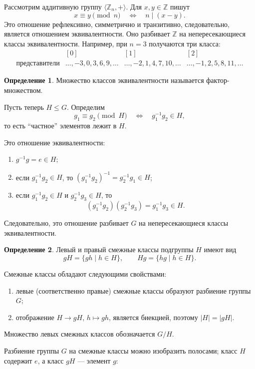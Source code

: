 \documentclass[12pt,a4paper,oneside,openany]{book}
\theoremstyle{definition}
\newtheorem{definition}{Определение}[chapter]
\theoremstyle{plain}
\theoremstyle{remark}
\newcommand{\Z}{\mathbb{Z}}
\begin{document}
Рассмотрим аддитивную группу $\langle\Z_n,+\rangle$. Для $x,y\in\Z$
пишут
\[
  x\equiv y\pmod n
  \quad\Longleftrightarrow\quad
  n\mid(x-y).
\]
Это отношение рефлексивно, симметрично и транзитивно, следовательно,
является отношением эквивалентности. Оно разбивает $\Z$ на
непересекающиеся классы эквивалентности. Например, при $n=3$ получаются
три класса:
\[
\begin{array}{c|ccc}
 & [0]&[1]&[2]\\ \hline
\text{представители}&\ldots,-3,0,3,6,9,\ldots&
\ldots,-2,1,4,7,10,\ldots&
\ldots,-1,2,5,8,11,\ldots
\end{array}
\]

\begin{definition}
Множество классов эквивалентности называется фактор-множеством.
\end{definition}


Пусть теперь $H\leq G$. Определим
\[
  g_1\equiv g_2\pmod H
  \quad\Longleftrightarrow\quad
  g_1^{-1}g_2\in H,
\]
то есть ``частное'' элементов лежит в $H$.

Это отношение эквивалентности:
\begin{enumerate}[label=\arabic*)]
  \item $g^{-1}g=e\in H$;
  \item если $g_1^{-1}g_2\in H$, то
  $(g_1^{-1}g_2)^{-1}=g_2^{-1}g_1\in H$;
  \item если $g_1^{-1}g_2\in H$ и $g_2^{-1}g_3\in H$, то
  \[
    (g_1^{-1}g_2)(g_2^{-1}g_3)=g_1^{-1}g_3\in H.
  \]
\end{enumerate}
Следовательно, это отношение разбивает $G$ на непересекающиеся классы
эквивалентности.

\begin{definition}
Левый и правый смежные классы подгруппы $H$ имеют вид
\[
  gH=\{gh\mid h\in H\},
  \qquad
  Hg=\{hg\mid h\in H\}.
\]
\end{definition}

Смежные классы обладают следующими свойствами:
\begin{enumerate}[label=\arabic*)]
  \item левые (соответственно правые) смежные классы образуют разбиение
  группы $G$;
  \item отображение $H\to gH$, $h\mapsto gh$, является биекцией, поэтому
  $|H|=|gH|$.
\end{enumerate}


Множество левых смежных классов обозначается $G/H$.

Разбиение группы \(G\) на смежные классы можно изобразить полосами;
класс \(H\) содержит \(e\), а класс \(gH\) --- элемент \(g\):
\end{document}
